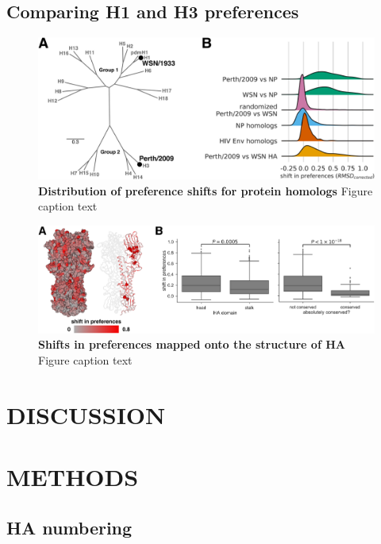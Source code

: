 \documentclass[11pt]{article}
\begin{document}
\subsection*{Comparing H1 and H3 preferences}

\begin{figure}
\centerline{\includegraphics[width=\textwidth]{figs/distance_distribution/distance_distribution.pdf}}
\caption{\label{fig:distance_distribution}
{\bf Distribution of preference shifts for protein homologs}
Figure caption text
}
\end{figure}

\begin{figure}
\centerline{\includegraphics[width=\textwidth]{figs/RMSD_heatmap/RMSD_heatmap.pdf}}
\caption{\label{fig:RMSD_heatmap}
{\bf Shifts in preferences mapped onto the structure of HA}
Figure caption text
}
\end{figure}


\section*{DISCUSSION}


\clearpage
\small

\section*{METHODS}
\label{sec:methods}
\subsection*{HA numbering}
\end{document}
